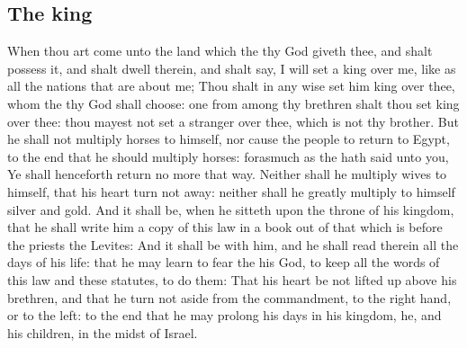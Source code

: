 \begin{biblechapter}
\section*{The king}
\verse When thou art come unto the land which the \LORD thy God giveth thee, and shalt possess it, and shalt dwell therein, and shalt say, I will set a king over me, like as all the nations that are about me;
\verse Thou shalt in any wise set him king over thee, whom the \LORD thy God shall choose: one from among thy brethren shalt thou set king over thee: thou mayest not set a stranger over thee, which is not thy brother.
\verse But he shall not multiply horses to himself, nor cause the people to return to Egypt, to the end that he should multiply horses: forasmuch as the \LORD hath said unto you, Ye shall henceforth return no more that way.
\verse Neither shall he multiply wives to himself, that his heart turn not away: neither shall he greatly multiply to himself silver and gold.
\verse And it shall be, when he sitteth upon the throne of his kingdom, that he shall write him a copy of this law in a book out of that which is before the priests the Levites:
\verse And it shall be with him, and he shall read therein all the days of his life: that he may learn to fear the \LORD his God, to keep all the words of this law and these statutes, to do them:
\verse That his heart be not lifted up above his brethren, and that he turn not aside from the commandment, to the right hand, or to the left: to the end that he may prolong his days in his kingdom, he, and his children, in the midst of Israel.
\end{biblechapter}

